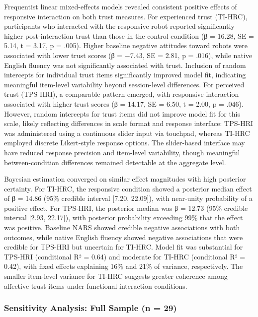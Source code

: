 \documentclass[
  letterpaper,
  DIV=11,
  numbers=noendperiod]{scrartcl}
\begin{document}
Frequentist linear mixed-effects models revealed consistent positive
effects of responsive interaction on both trust measures. For
experienced trust (TI-HRC), participants who interacted with the
responsive robot reported significantly higher post-interaction trust
than those in the control condition (β = 16.28, SE = 5.14, t = 3.17, p =
.005). Higher baseline negative attitudes toward robots were associated
with lower trust scores (β = −7.43, SE = 2.81, p = .016), while native
English fluency was not significantly associated with trust. Inclusion
of random intercepts for individual trust items significantly improved
model fit, indicating meaningful item-level variability beyond
session-level differences. For perceived trust (TPS-HRI), a comparable
pattern emerged, with responsive interaction associated with higher
trust scores (β = 14.17, SE = 6.50, t = 2.00, p = .046). However, random
intercepts for trust items did not improve model fit for this scale,
likely reflecting differences in scale format and response interface:
TPS-HRI was administered using a continuous slider input via touchpad,
whereas TI-HRC employed discrete Likert-style response options. The
slider-based interface may have reduced response precision and
item-level variability, though meaningful between-condition differences
remained detectable at the aggregate level.

Bayesian estimation converged on similar effect magnitudes with high
posterior certainty. For TI-HRC, the responsive condition showed a
posterior median effect of β = 14.86 (95\% credible interval {[}7.20,
22.09{]}), with near-unity probability of a positive effect. For
TPS-HRI, the posterior median was β = 12.73 (95\% credible interval
{[}2.93, 22.17{]}), with posterior probability exceeding 99\% that the
effect was positive. Baseline NARS showed credible negative associations
with both outcomes, while native English fluency showed negative
associations that were credible for TPS-HRI but uncertain for TI-HRC.
Model fit was substantial for TPS-HRI (conditional R² = 0.64) and
moderate for TI-HRC (conditional R² = 0.42), with fixed effects
explaining 16\% and 21\% of variance, respectively. The smaller
item-level variance for TI-HRC suggests greater coherence among
affective trust items under functional interaction conditions.

\subsubsection{Sensitivity Analysis: Full Sample (n =
29)}\label{sensitivity-analysis-full-sample-n-29}
\end{document}
